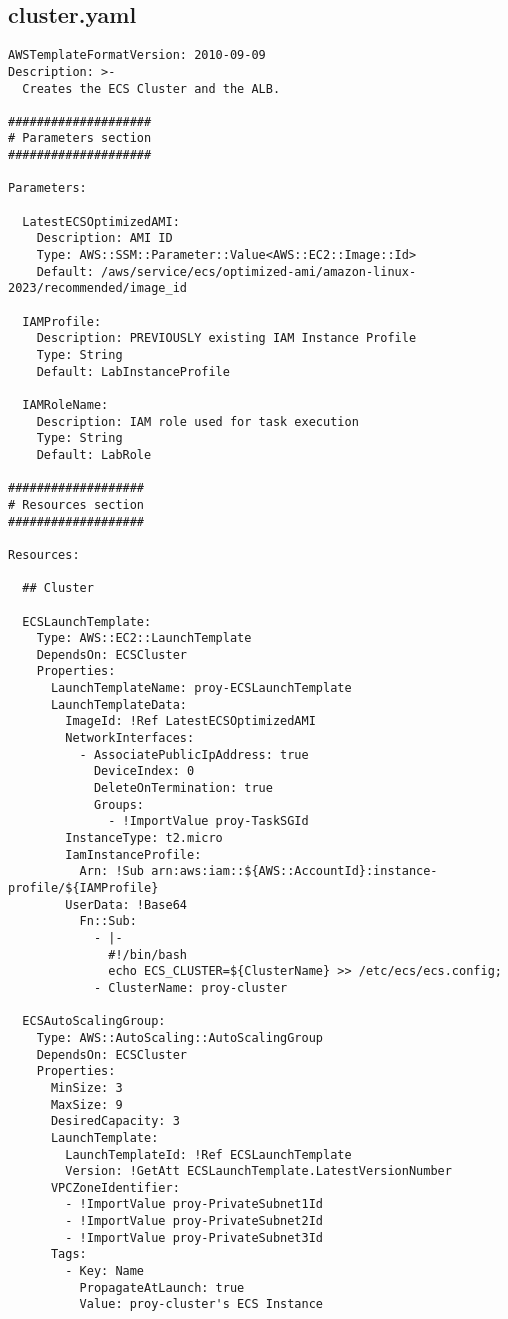 \subsection{cluster.yaml}

\begin{verbatim}
AWSTemplateFormatVersion: 2010-09-09
Description: >-
  Creates the ECS Cluster and the ALB.

####################
# Parameters section
####################

Parameters:

  LatestECSOptimizedAMI:
    Description: AMI ID
    Type: AWS::SSM::Parameter::Value<AWS::EC2::Image::Id>
    Default: /aws/service/ecs/optimized-ami/amazon-linux-2023/recommended/image_id

  IAMProfile:
    Description: PREVIOUSLY existing IAM Instance Profile
    Type: String
    Default: LabInstanceProfile

  IAMRoleName:
    Description: IAM role used for task execution
    Type: String
    Default: LabRole

###################
# Resources section
###################

Resources:

  ## Cluster

  ECSLaunchTemplate:
    Type: AWS::EC2::LaunchTemplate
    DependsOn: ECSCluster
    Properties:
      LaunchTemplateName: proy-ECSLaunchTemplate
      LaunchTemplateData:
        ImageId: !Ref LatestECSOptimizedAMI
        NetworkInterfaces:
          - AssociatePublicIpAddress: true
            DeviceIndex: 0
            DeleteOnTermination: true
            Groups: 
              - !ImportValue proy-TaskSGId
        InstanceType: t2.micro
        IamInstanceProfile:
          Arn: !Sub arn:aws:iam::${AWS::AccountId}:instance-profile/${IAMProfile}
        UserData: !Base64
          Fn::Sub:
            - |-
              #!/bin/bash
              echo ECS_CLUSTER=${ClusterName} >> /etc/ecs/ecs.config;
            - ClusterName: proy-cluster

  ECSAutoScalingGroup:
    Type: AWS::AutoScaling::AutoScalingGroup
    DependsOn: ECSCluster
    Properties:
      MinSize: 3
      MaxSize: 9
      DesiredCapacity: 3
      LaunchTemplate:
        LaunchTemplateId: !Ref ECSLaunchTemplate
        Version: !GetAtt ECSLaunchTemplate.LatestVersionNumber
      VPCZoneIdentifier:
        - !ImportValue proy-PrivateSubnet1Id
        - !ImportValue proy-PrivateSubnet2Id
        - !ImportValue proy-PrivateSubnet3Id
      Tags:
        - Key: Name
          PropagateAtLaunch: true
          Value: proy-cluster's ECS Instance


\end{verbatim}
